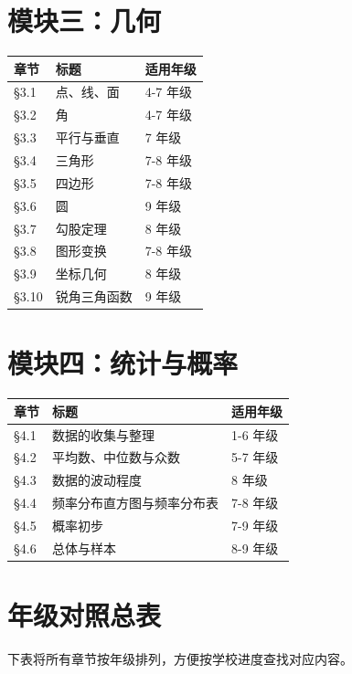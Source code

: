 \section*{模块三：几何}


\begin{center}
\begin{tabular}{lll}
\toprule
章节 & 标题 & 适用年级 \\
\midrule
§3.1 & 点、线、面 & 4-7 年级 \\
§3.2 & 角 & 4-7 年级 \\
§3.3 & 平行与垂直 & 7 年级 \\
§3.4 & 三角形 & 7-8 年级 \\
§3.5 & 四边形 & 7-8 年级 \\
§3.6 & 圆 & 9 年级 \\
§3.7 & 勾股定理 & 8 年级 \\
§3.8 & 图形变换 & 7-8 年级 \\
§3.9 & 坐标几何 & 8 年级 \\
§3.10 & 锐角三角函数 & 9 年级 \\
\bottomrule
\end{tabular}
\end{center}


\section*{模块四：统计与概率}


\begin{center}
\begin{tabular}{lll}
\toprule
章节 & 标题 & 适用年级 \\
\midrule
§4.1 & 数据的收集与整理 & 1-6 年级 \\
§4.2 & 平均数、中位数与众数 & 5-7 年级 \\
§4.3 & 数据的波动程度 & 8 年级 \\
§4.4 & 频率分布直方图与频率分布表 & 7-8 年级 \\
§4.5 & 概率初步 & 7-9 年级 \\
§4.6 & 总体与样本 & 8-9 年级 \\
\bottomrule
\end{tabular}
\end{center}


\section*{年级对照总表}


下表将所有章节按年级排列，方便按学校进度查找对应内容。

